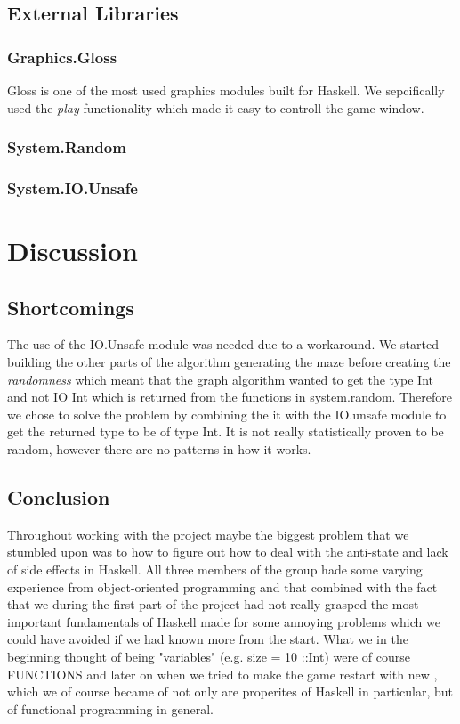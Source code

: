 \documentclass[12pt, a4paper]{article}
\begin{document}
\subsection{External Libraries}
\subsubsection{Graphics.Gloss}
Gloss is one of the most used graphics modules built for Haskell. We sepcifically used the \textit{play} functionality which made it easy to controll the game window. 

\subsubsection{System.Random}

\subsubsection{System.IO.Unsafe}


\newpage
\section{Discussion}
\subsection{Shortcomings}
The use of the IO.Unsafe module was needed due to a workaround. We started building the other parts of the algorithm generating  the maze  before creating the \textit{randomness} which meant that the graph algorithm wanted to get the type Int and not IO Int which is returned from the functions in system.random. Therefore we chose to solve the problem by combining the it  with the IO.unsafe module to get the returned type to be of type Int. It is not really statistically proven to be random, however there are no patterns in how it works.








\subsection{Conclusion}
Throughout working with the project maybe the biggest problem that we stumbled upon was to how to figure out how to deal with the anti-state and lack of side effects in Haskell. All three members of the group hade some varying experience from object-oriented programming and that combined with the fact that we during the first part of the project had not really grasped the most important fundamentals of Haskell made for some annoying problems which we could have avoided if we had known more from the start. What we in the beginning thought of being "variables" (e.g. size = 10 ::Int) were of course FUNCTIONS and later on when we tried to make the game restart with new , which we of course became of not only are properites of Haskell in particular, but of functional programming in general. 
\end{document}
